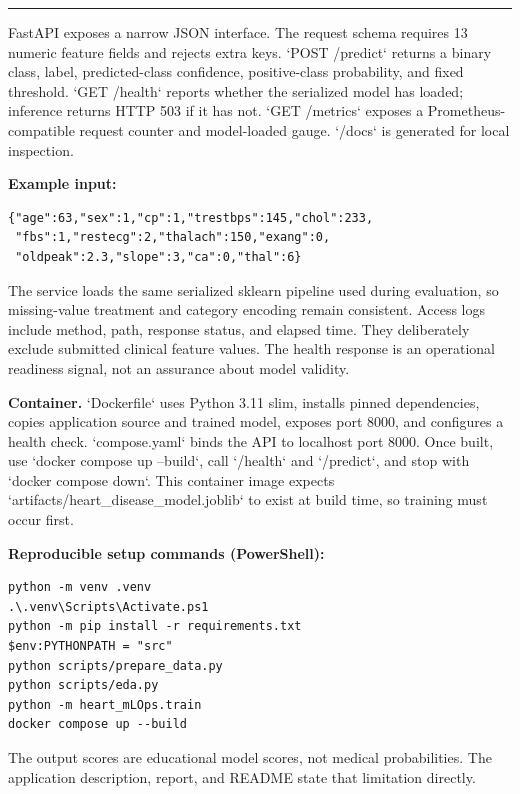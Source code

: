 \documentclass[10pt]{article}
\newcommand{\sectiontitle}[1]{\vspace*{0.15in}{\Large\bfseries\color{navy}#1}\par\vspace{0.08in}\hrule\vspace{0.16in}}
\begin{document}
\newpage
\sectiontitle{6. Model API and container packaging}
FastAPI exposes a narrow JSON interface. The request schema requires 13 numeric feature fields and rejects extra keys. `POST /predict` returns a binary class, label, predicted-class confidence, positive-class probability, and fixed threshold. `GET /health` reports whether the serialized model has loaded; inference returns HTTP 503 if it has not. `GET /metrics` exposes a Prometheus-compatible request counter and model-loaded gauge. `/docs` is generated for local inspection.

\textbf{Example input:}
\begin{verbatim}
{"age":63,"sex":1,"cp":1,"trestbps":145,"chol":233,
 "fbs":1,"restecg":2,"thalach":150,"exang":0,
 "oldpeak":2.3,"slope":3,"ca":0,"thal":6}
\end{verbatim}

The service loads the same serialized sklearn pipeline used during evaluation, so missing-value treatment and category encoding remain consistent. Access logs include method, path, response status, and elapsed time. They deliberately exclude submitted clinical feature values. The health response is an operational readiness signal, not an assurance about model validity.

\textbf{Container.} `Dockerfile` uses Python 3.11 slim, installs pinned dependencies, copies application source and trained model, exposes port 8000, and configures a health check. `compose.yaml` binds the API to localhost port 8000. Once built, use `docker compose up --build`, call `/health` and `/predict`, and stop with `docker compose down`. This container image expects `artifacts/heart_disease_model.joblib` to exist at build time, so training must occur first.

\textbf{Reproducible setup commands (PowerShell):}
\begin{verbatim}
python -m venv .venv
.\.venv\Scripts\Activate.ps1
python -m pip install -r requirements.txt
$env:PYTHONPATH = "src"
python scripts/prepare_data.py
python scripts/eda.py
python -m heart_mLOps.train
docker compose up --build
\end{verbatim}

The output scores are educational model scores, not medical probabilities. The application description, report, and README state that limitation directly.
\end{document}
